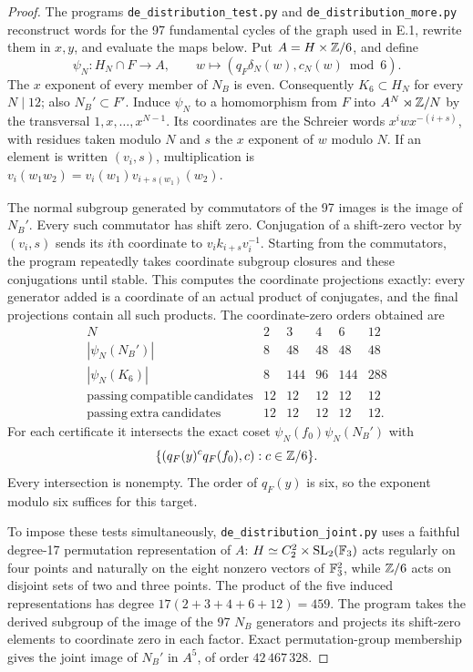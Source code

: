 \begin{proof}
The programs \texttt{de\_distribution\_test.py} and
\texttt{de\_distribution\_more.py} reconstruct words for the 97
fundamental cycles of the graph used in E.1, rewrite them in $x,y$,
and evaluate the maps below. Put $A=H\times\mathbb Z/6$, and define
\[
 \psi_N:H_N\cap F\to A,\qquad
 w\longmapsto(q_F\delta_N(w),c_N(w)\bmod6).
\]
The $x$ exponent of every member of $N_B$ is even. Consequently
$K_6\subset H_N$ for every $N\mid12$; also $N_B'\subset F'$.
Induce $\psi_N$ to a homomorphism from $F$ into
$A^N\rtimes\mathbb Z/N$ by the transversal $1,x,\ldots,x^{N-1}$.
Its coordinates are the Schreier words
$x^iwx^{-(i+s)}$, with residues taken modulo $N$ and
$s$ the $x$ exponent of $w$ modulo $N$.
If an element is written $(v_i,s)$, multiplication is
$v_i(w_1w_2)=v_i(w_1)v_{i+s(w_1)}(w_2)$.

The normal subgroup generated by commutators of the 97 images is
the image of $N_B'$. Every such commutator has shift zero.
Conjugation of a shift-zero vector by $(v_i,s)$ sends its $i$th
coordinate to $v_i k_{i+s}v_i^{-1}$. Starting from the commutators,
the program repeatedly takes coordinate subgroup closures and these
conjugations until stable. This computes the coordinate projections
exactly: every generator added is a coordinate of an actual product
of conjugates, and the final projections contain all such products.
The coordinate-zero orders obtained are
\[
\begin{array}{c|rrrrr}
 N&2&3&4&6&12\\\hline
 |\psi_N(N_B')|&8&48&48&48&48\\
 |\psi_N(K_6)|&8&144&96&144&288\\
 \mathrm{passing\ compatible\ candidates}&12&12&12&12&12\\
 \mathrm{passing\ extra\ candidates}&12&12&12&12&12.
\end{array}
\]
For each certificate it intersects the exact coset
$\psi_N(f_0)\psi_N(N_B')$ with
\[
 \{(q_F(y)^c q_F(f_0),c):c\in\mathbb Z/6\}.
\]
Every intersection is nonempty. The order of $q_F(y)$ is six,
so the exponent modulo six suffices for this target.

To impose these tests simultaneously, \texttt{de\_distribution\_joint.py}
uses a faithful degree-17 permutation representation of $A$:
$H\simeq C_2^2\times\mathrm{SL}_2(\mathbb F_3)$ acts regularly on four
points and naturally on the eight nonzero vectors of $\mathbb F_3^2$,
while $\mathbb Z/6$ acts on disjoint sets of two and three points.
The product of the five induced representations has degree
$17(2+3+4+6+12)=459$. The program takes the derived subgroup of
the image of the 97 $N_B$ generators and projects its shift-zero
elements to coordinate zero in each factor. Exact permutation-group
membership gives the joint image of $N_B'$ in $A^5$, of order
$42\,467\,328$.


\end{proof}

